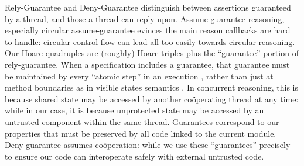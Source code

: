 Rely-Guarantee
\cite{relyGuarantee-HayesJones-setss2017,relyGuarantee-vanStaden-mpc2015}
and Deny-Guarantee \cite{DenyGuarantee} %
distinguish between assertions guaranteed by a thread, and those a
thread can reply upon. %
Assume-guarantee
reasoning, especially circular
assume-guarantee  \cite{circular-assume-guarantee-fm2015} evinces
the main reason callbacks
are hard to handle: circular control flow can lead
all too easily towards circular reasoning.
Our Hoare quadruples are (roughly) Hoare triples plus 
the ``guarantee'' portion of rely-guarantee.
When a
specification includes a guarantee, that guarantee must be maintained
by every ``atomic step'' in an execution
\cite{relyGuarantee-HayesJones-setss2017}, rather than just at method
boundaries as in visible states semantics
\cite{MuellerPoetzsch-HeffterLeavens06,DrossoFrancaMuellerSummers08,considerate}.
%
In concurrent reasoning, %
this is because shared state may be accessed
by another co{\"o}perating thread at any time:
while in our case, it is because unprotected
state may be accessed by an untrusted component within the same
thread.  Guarantees correspond to our
properties that must be preserved by all code linked to the current
module. Deny-guarantee assumes
co{\"o}peration:
while we use these ``guarantees'' precisely to
ensure our code can interoperate safely with external untrusted code.

















